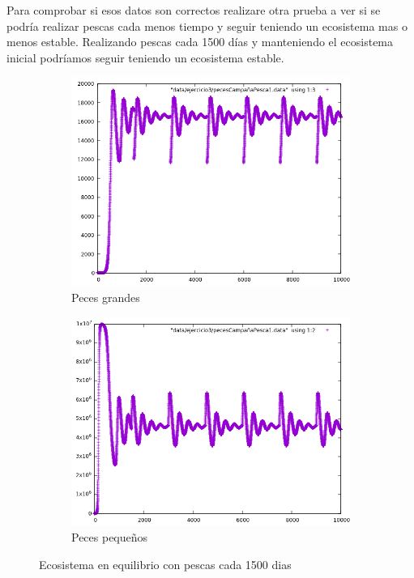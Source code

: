 \documentclass[12pt,a4paper]{article}
\begin{document}
Para comprobar si esos datos son correctos realizare otra prueba a ver si se podría realizar pescas cada menos tiempo y seguir teniendo un ecosistema mas o menos estable. Realizando pescas cada 1500 días y manteniendo el ecosistema inicial podríamos seguir teniendo un ecosistema estable. 

\begin{figure}[H]
	\centering
	\begin{subfigure}{.5\textwidth}
		\centering
		\includegraphics[width=1\linewidth]{./images/pesca2Grandes.png}
		\caption{Peces grandes}
		\label{fig:subPecesGrandes3}
	\end{subfigure}%
	\begin{subfigure}{.5\textwidth}
		\centering
		\includegraphics[width=1\linewidth]{./images/pesca2Peques.png}
		\caption{Peces pequeños}
		\label{fig:subPecesPeque3}
	\end{subfigure}
	\caption{Ecosistema en equilibrio con pescas cada 1500 dias}
	\label{fig:ecosistema3}
\end{figure}
\end{document}
